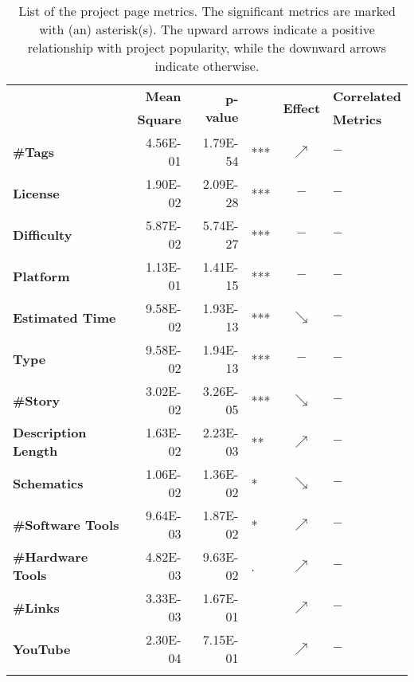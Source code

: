 \begin{table}[t]
\centering
\scriptsize
\caption{List of the project page metrics. The significant metrics are marked with (an) asterisk(s). The upward arrows indicate a positive relationship with project popularity, while the downward arrows indicate otherwise.}
	\setlength{\tabcolsep}{3.8pt}
\label{table:RQ1}
	\begin{tabularx}{0.8\columnwidth}{>{\bfseries}lrrlcl}
	\toprule
\multirow{2}{*}{Metric} & \textbf{Mean}  & \multirow{2}{*}{\textbf{p-value}}  &     & \multirow{2}{*}{\textbf{Effect}}     &\textbf{Correlated}\\
&\textbf{Square}&& &&\textbf{Metrics} \\
	\midrule	\midrule
\#Tags                 & 4.56E-01 & 1.79E-54 & *** & $\nearrow$ & $-$                  \\
License                & 1.90E-02 & 2.09E-28 & *** & $-$        & $-$                  \\
Difficulty             & 5.87E-02 & 5.74E-27 & *** & $-$        & $-$                  \\
Platform               & 1.13E-01 & 1.41E-15 & *** & $-$ & $-$                  \\
Estimated Time        & 9.58E-02 & 1.93E-13 & *** & $\searrow$ & $-$                  \\
Type                   &  9.58E-02 & 1.94E-13 & *** & $-$        & $-$                  \\
\#Story                & 3.02E-02 & 3.26E-05 & *** & $\searrow$ & $-$                  \\
Description Length    & 1.63E-02 & 2.23E-03 & **  & $\nearrow$ & $-$                  \\
Schematics & 1.06E-02 & 1.36E-02 & *   & $\searrow$ & $-$                  \\
\#Software Tools             & 9.64E-03 & 1.87E-02 & *   & $\nearrow$ & $-$                  \\
\#Hardware Tools            & 4.82E-03 & 9.63E-02 & .   & $\nearrow$ & $-$                  \\
\#Links                & 3.33E-03 & 1.67E-01 &     & $\nearrow$ & $-$                  \\
YouTube           & 2.30E-04 & 7.15E-01 &     & $\nearrow$ & $-$              \\ \bottomrule
\multicolumn{6}{l}{$p-value$ codes:  `***'$<0$, `**'$<0.001$, `*'$<0.01$, `.'$<0.05$}\\ 
\end{tabularx}
\end{table}
